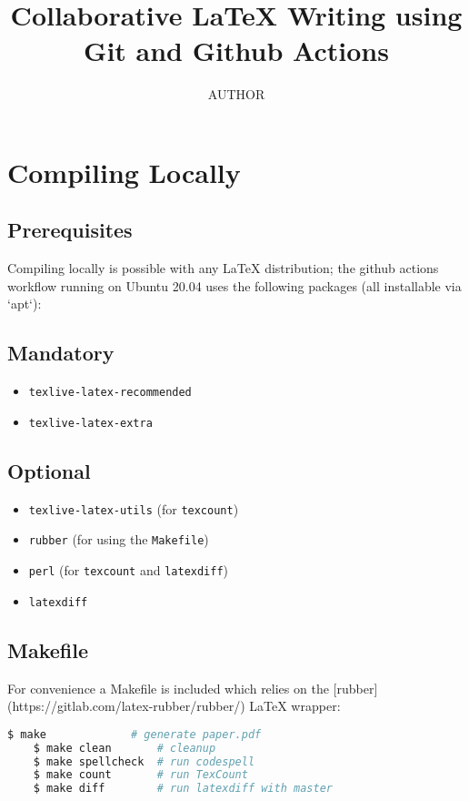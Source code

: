 \documentclass[]{article}
\title{Collaborative LaTeX Writing using Git and Github Actions}
\author{AUTHOR}
\begin{document}
\maketitle

\section{Compiling Locally}

\subsection{Prerequisites}

Compiling locally is possible with any LaTeX distribution; the github actions workflow running on Ubuntu 20.04 uses the following packages (all installable via `apt`):

\subsection*{Mandatory}
\begin{itemize}

	\item \texttt{texlive-latex-recommended}
	\item \texttt{texlive-latex-extra}

\end{itemize}

\subsection*{Optional}
\begin{itemize}

	\item \texttt{texlive-latex-utils} \quad (for \texttt{texcount})
	\item \texttt{rubber} \quad (for using the \texttt{Makefile})
	\item \texttt{perl} \quad (for \texttt{texcount} and \texttt{latexdiff})
	\item \texttt{latexdiff}

\end{itemize}


\subsection{Makefile}

For convenience a Makefile is included which relies on the [rubber](https://gitlab.com/latex-rubber/rubber/) LaTeX wrapper:


\begin{center}
	\begin{lstlisting}[language=Bash,morekeywords={make}]
	$ make             # generate paper.pdf
	$ make clean       # cleanup
	$ make spellcheck  # run codespell
	$ make count       # run TexCount
	$ make diff        # run latexdiff with master
	\end{lstlisting}
\end{center}
\end{document}
